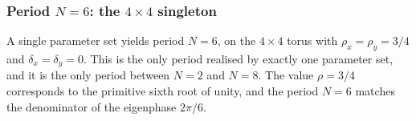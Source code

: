 \subsubsection{Period $N = 6$: the $4 \times 4$ singleton}

A single parameter set yields period $N = 6$, on the $4 \times 4$ torus
with $\rho_x = \rho_y = 3/4$ and $\delta_x = \delta_y = 0$. This is the
only period realised by exactly one parameter set, and it is the only
period between $N = 2$ and $N = 8$. The value $\rho = 3/4$ corresponds
to the primitive sixth root of unity, and the period $N = 6$ matches
the denominator of the eigenphase $2\pi/6$.

